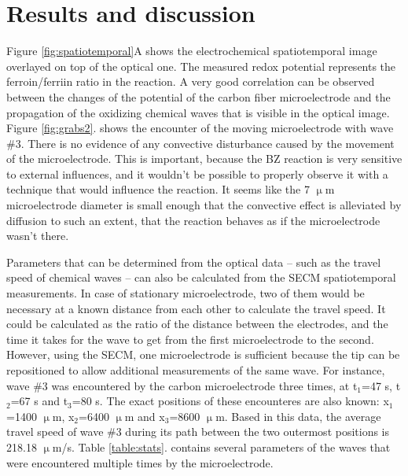 \documentclass[3p, twocolumn]{elsarticle}
\begin{document}
\section{Results and discussion}

Figure \ref{fig:spatiotemporal}A shows the electrochemical spatiotemporal image overlayed on top of the optical one.
The measured redox potential represents the ferroin/ferriin ratio in the reaction.
A very good correlation can be observed between the changes of the potential of the carbon fiber microelectrode and the propagation of the oxidizing chemical waves that is visible in the optical image.
Figure \ref{fig:grabs2}. shows the encounter of the moving microelectrode with wave \#3.
There is no evidence of any convective disturbance caused by the movement of the microelectrode.
This is important, because the BZ reaction is very sensitive to external influences, and it wouldn't be possible to properly observe it with a technique that would influence the reaction.
It seems like the 7 $\upmu$m microelectrode diameter is small enough that the convective effect is alleviated by diffusion to such an extent, that the reaction behaves as if the microelectrode wasn't there.

Parameters that can be determined from the optical data -- such as the travel speed of chemical waves -- can also be calculated from the SECM spatiotemporal measurements.
In case of stationary microelectrode, two of them would be necessary at a known distance from each other to calculate the travel speed.
It could be calculated as the ratio of the distance between the electrodes, and the time it takes for the wave to get from the first microelectrode to the second.
However, using the SECM, one microelectrode is sufficient because the tip can be repositioned to allow additional measurements of the same wave.
For instance, wave \#3 was encountered by the carbon microelectrode three times, at t$_1$=47 s, t$_2$=67 s and t$_3$=80 s.
The exact positions of these encounteres are also known: x$_1$=1400 $\upmu$m, x$_2$=6400 $\upmu$m and x$_3$=8600 $\upmu$m.
Based in this data, the average travel speed of wave \#3 during its path between the two outermost positions is 218.18 $\upmu$m/s.
Table \ref{table:stats}. contains several parameters of the waves that were encountered multiple times by the microelectrode. 
\end{document}

